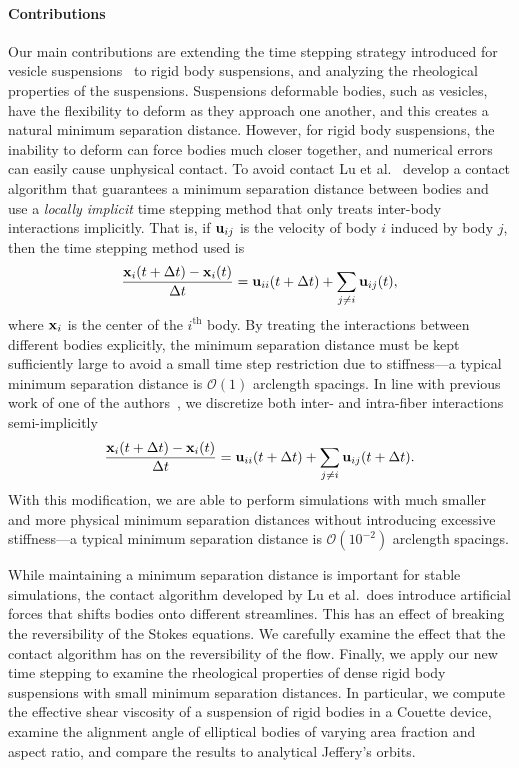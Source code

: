 \documentclass[preprint, 10pt]{elsarticle}
\begin{document}
\paragraph{Contributions} Our main contributions are extending the time
stepping strategy introduced for vesicle suspensions~\cite{Quaife2014}
to rigid body suspensions, and analyzing the rheological properties of
the suspensions.  Suspensions deformable bodies, such as vesicles, have
the flexibility to deform as they approach one another, and this creates
a natural minimum separation distance.  However, for rigid body
suspensions, the inability to deform can force bodies much closer
together, and numerical errors can easily cause unphysical contact.  To
avoid contact Lu et al.~\cite{Lu2017} develop a contact algorithm that
guarantees a minimum separation distance between bodies and use a {\em
locally implicit} time stepping method that only treats inter-body
interactions implicitly.  That is, if ${\mathbf{u}}_{ij}$ is the velocity of body
$i$ induced
by body $j$, then the time stepping method used is
\begin{align*}
  \frac{{\mathbf{x}}_i(t + \Delta t) -  {\mathbf{x}}_i(t)}{\Delta t} = 
    {\mathbf{u}}_{ii}(t+\Delta t) + \sum_{j \neq i} {\mathbf{u}}_{ij}(t),
\end{align*}
where ${\mathbf{x}}_i$ is the center of the $i^{\mathrm{th}}$ body.  By treating
the interactions between different bodies explicitly, the minimum
separation distance must be kept sufficiently large to avoid a small
time step restriction due to stiffness---a typical minimum separation
distance is $\mathcal{O}(1)$ arclength spacings.  In line with previous
work of one of the authors~\cite{Quaife2014}, we discretize both inter-
and intra-fiber interactions semi-implicitly
\begin{align*}
  \frac{{\mathbf{x}}_i(t + \Delta t) -  {\mathbf{x}}_i(t)}{\Delta t} = 
    {\mathbf{u}}_{ii}(t+\Delta t) + \sum_{j \neq i} {\mathbf{u}}_{ij}(t+\Delta t).
\end{align*}
With this modification, we are able to perform simulations with much
smaller and more physical minimum separation distances without
introducing excessive stiffness---a typical minimum separation distance
is $\mathcal{O}(10^{-2})$ arclength spacings.

While maintaining a minimum separation distance is important for stable
simulations, the contact algorithm developed by Lu et al.~does introduce
artificial forces that shifts bodies onto different streamlines.  This
has an effect of breaking the reversibility of the Stokes equations.  We
carefully examine the effect that the contact algorithm has on the
reversibility of the flow.  Finally, we apply our new time stepping to
examine the rheological properties of dense rigid body suspensions with
small minimum separation distances.  In particular, we compute the
effective shear viscosity of a suspension of rigid bodies in a Couette
device, examine the alignment angle of elliptical bodies of varying area
fraction and aspect ratio, and compare the results to analytical
Jeffery's orbits.
\end{document}
